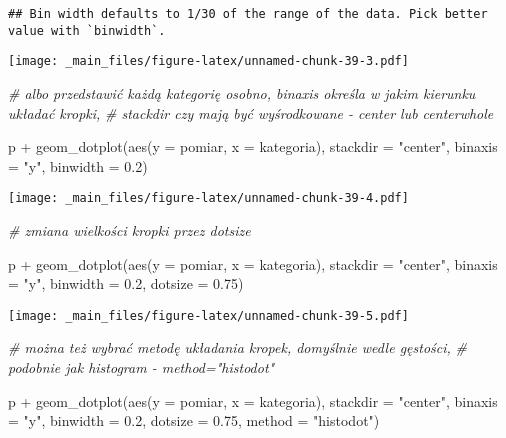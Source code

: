 \documentclass[
]{book}
\newenvironment{Shaded}{\begin{snugshade}}{\end{snugshade}}
\newcommand{\AttributeTok}[1]{\textcolor[rgb]{0.77,0.63,0.00}{#1}}
\newcommand{\CommentTok}[1]{\textcolor[rgb]{0.56,0.35,0.01}{\textit{#1}}}
\newcommand{\FloatTok}[1]{\textcolor[rgb]{0.00,0.00,0.81}{#1}}
\newcommand{\FunctionTok}[1]{\textcolor[rgb]{0.00,0.00,0.00}{#1}}
\newcommand{\NormalTok}[1]{#1}
\newcommand{\SpecialCharTok}[1]{\textcolor[rgb]{0.00,0.00,0.00}{#1}}
\newcommand{\StringTok}[1]{\textcolor[rgb]{0.31,0.60,0.02}{#1}}
\begin{document}
\begin{verbatim}
## Bin width defaults to 1/30 of the range of the data. Pick better value with `binwidth`.
\end{verbatim}

\texttt{[image: \_main\_files/figure-latex/unnamed-chunk-39-3.pdf]}

\begin{Shaded}
\begin{Highlighting}[]
\CommentTok{\# albo przedstawić każdą kategorię osobno, binaxis określa w jakim kierunku układać kropki,}
\CommentTok{\# stackdir czy mają być wyśrodkowane {-} center lub centerwhole}

\NormalTok{p }\SpecialCharTok{+} \FunctionTok{geom\_dotplot}\NormalTok{(}\FunctionTok{aes}\NormalTok{(}\AttributeTok{y =}\NormalTok{ pomiar, }\AttributeTok{x =}\NormalTok{ kategoria), }\AttributeTok{stackdir =} \StringTok{"center"}\NormalTok{, }\AttributeTok{binaxis =} \StringTok{"y"}\NormalTok{, }\AttributeTok{binwidth =} \FloatTok{0.2}\NormalTok{)}
\end{Highlighting}
\end{Shaded}

\texttt{[image: \_main\_files/figure-latex/unnamed-chunk-39-4.pdf]}

\begin{Shaded}
\begin{Highlighting}[]
\CommentTok{\# zmiana wielkości kropki przez dotsize}

\NormalTok{p }\SpecialCharTok{+} \FunctionTok{geom\_dotplot}\NormalTok{(}\FunctionTok{aes}\NormalTok{(}\AttributeTok{y =}\NormalTok{ pomiar, }\AttributeTok{x =}\NormalTok{ kategoria), }\AttributeTok{stackdir =} \StringTok{"center"}\NormalTok{, }\AttributeTok{binaxis =} \StringTok{"y"}\NormalTok{, }
                 \AttributeTok{binwidth =} \FloatTok{0.2}\NormalTok{, }\AttributeTok{dotsize =} \FloatTok{0.75}\NormalTok{)}
\end{Highlighting}
\end{Shaded}

\texttt{[image: \_main\_files/figure-latex/unnamed-chunk-39-5.pdf]}

\begin{Shaded}
\begin{Highlighting}[]
\CommentTok{\# można też wybrać metodę układania kropek, domyślnie wedle gęstości, }
\CommentTok{\# podobnie jak histogram {-} method="histodot"}

\NormalTok{p }\SpecialCharTok{+} \FunctionTok{geom\_dotplot}\NormalTok{(}\FunctionTok{aes}\NormalTok{(}\AttributeTok{y =}\NormalTok{ pomiar, }\AttributeTok{x =}\NormalTok{ kategoria), }\AttributeTok{stackdir =} \StringTok{"center"}\NormalTok{, }\AttributeTok{binaxis =} \StringTok{"y"}\NormalTok{, }
                 \AttributeTok{binwidth =} \FloatTok{0.2}\NormalTok{, }\AttributeTok{dotsize =} \FloatTok{0.75}\NormalTok{, }\AttributeTok{method =} \StringTok{"histodot"}\NormalTok{)}
\end{Highlighting}
\end{Shaded}
\end{document}
